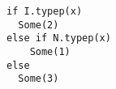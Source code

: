 \begin{lstlisting}[style=scalaioScala]
if I.typep(x)
  Some(2)
else if N.typep(x)
    Some(1)
else
  Some(3)
\end{lstlisting}
